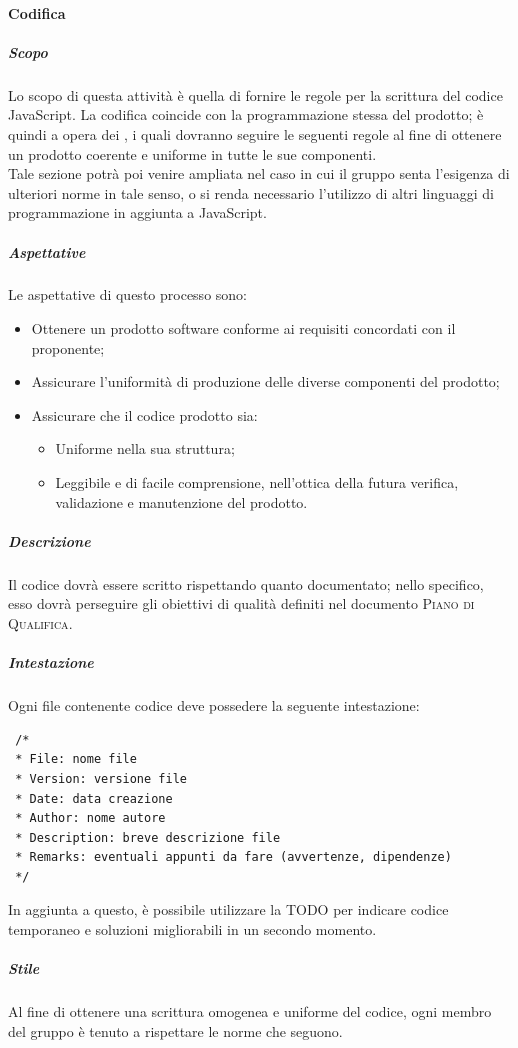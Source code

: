 \documentclass[../norme-di-progetto.tex]{subfiles}
\begin{document}
\paragraph{Codifica}
\subparagraph{Scopo}
Lo scopo di questa attività è quella di fornire le regole per la scrittura del codice JavaScript. La codifica coincide con la programmazione stessa del prodotto; è quindi a opera dei , i quali dovranno seguire le seguenti regole al fine di ottenere un prodotto coerente e uniforme in tutte le sue componenti. \\
Tale sezione potrà poi venire ampliata nel caso in cui il gruppo senta l'esigenza di ulteriori norme in tale senso, o si renda necessario l'utilizzo di altri linguaggi di programmazione in aggiunta a JavaScript.
\subparagraph{Aspettative}
Le aspettative di questo processo sono:
\begin{itemize}
  \item Ottenere un prodotto software conforme ai requisiti concordati con il proponente;
  \item Assicurare l'uniformità di produzione delle diverse componenti del prodotto;
  \item Assicurare che il codice prodotto sia:
  \begin{itemize}
    \item Uniforme nella sua struttura;
    \item Leggibile e di facile comprensione, nell'ottica della futura verifica, validazione e manutenzione del prodotto.
  \end{itemize}
\end{itemize}
\subparagraph{Descrizione}
Il codice dovrà essere scritto rispettando quanto documentato; nello specifico, esso dovrà perseguire gli obiettivi di qualità definiti nel documento \textsc{Piano di Qualifica}.

\subparagraph{Intestazione}
Ogni file contenente codice deve possedere la seguente intestazione:
\begin{lstlisting}
 /*
 * File: nome file
 * Version: versione file
 * Date: data creazione
 * Author: nome autore
 * Description: breve descrizione file
 * Remarks: eventuali appunti da fare (avvertenze, dipendenze)
 */
\end{lstlisting}
In aggiunta a questo, è possibile utilizzare la  TODO per indicare codice temporaneo e soluzioni migliorabili in un secondo momento.

\subparagraph{Stile}
Al fine di ottenere una scrittura omogenea e uniforme del codice, ogni membro del gruppo è tenuto a rispettare le norme che seguono.
\end{document}
